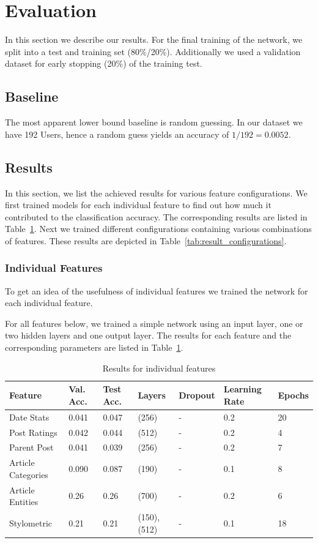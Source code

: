 \documentclass[acmsmall]{acmart}
\begin{document}
\section{Evaluation}
In this section we describe our results. For the final training of the network, we split into a test and training set (80\%/20\%). Additionally we used a validation dataset for early stopping (20\%) of the training test. 

\subsection{Baseline}
The most apparent lower bound baseline is random guessing. In our dataset we have 192 Users, hence a random guess yields an accuracy of $1/192 = 0.0052$. 

\subsection{Results}
In this section, we list the achieved results for various feature configurations.
We first trained models for each individual feature to find out how much it contributed to the classification accuracy. The corresponding results are listed in Table~\ref{tab:result_features}. 
Next we trained different configurations containing various combinations of features. These results are depicted in Table~\ref{tab:result_configurations}.

\subsubsection{Individual Features}
To get an idea of the usefulness of individual features we trained the network for each individual feature. 

For all features below, we trained a simple network using an input layer, one or two hidden layers and one output layer. 
The results for each feature and the corresponding parameters are listed in Table~\ref{tab:result_features}.

\begin{table}[H]
\begin{tabular}{lllllll}
Feature & Val. Acc. & Test Acc. & Layers & Dropout & Learning Rate & Epochs\\ \hline
Date Stats & 0.041 & 0.047 & (256) & - & 0.2 & 20 \\
Post Ratings & 0.042 & 0.044 & (512) & - & 0.2 & 4 \\
Parent Post & 0.041 & 0.039 & (256) & - & 0.2 & 7 \\
Article Categories & 0.090 & 0.087 & (190) & - & 0.1 & 8 \\
Article Entities & 0.26 & 0.26 &  (700)  & - & 0.2 & 6 \\
Stylometric & 0.21 & 0.21 & (150),(512) & - & 0.1 & 18 
\end{tabular}
\caption{Results for individual features}
\label{tab:result_features}
\end{table}
\end{document}
